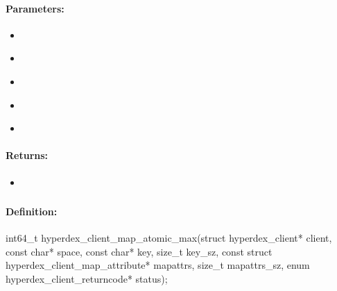 \paragraph{Parameters:}
\begin{itemize}[noitemsep]
\item {}\\

\item {}\\

\item {}\\

\item {}\\

\item {}\\

\end{itemize}

\paragraph{Returns:}
\begin{itemize}[noitemsep]
\item {}\\

\end{itemize}

\pagebreak
\subsubsection{}
\label{api:c:map_atomic_max}


\paragraph{Definition:}
\begin{ccode}
int64_t hyperdex_client_map_atomic_max(struct hyperdex_client* client,
        const char* space,
        const char* key, size_t key_sz,
        const struct hyperdex_client_map_attribute* mapattrs, size_t mapattrs_sz,
        enum hyperdex_client_returncode* status);
\end{ccode}

